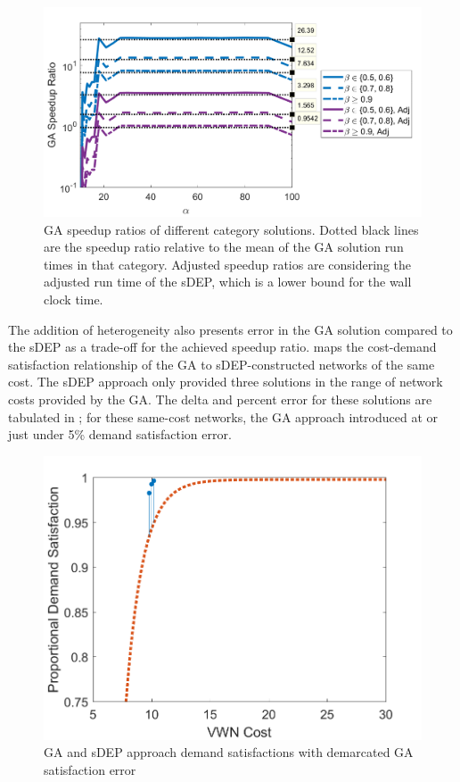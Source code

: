 \documentclass[12pt,dvipsnames]{report}
\begin{document}
\begin{figure}[htp]
	\centering
	\includegraphics[height=0.4\textheight]{Figures/CaseII_GASpeedupRatios2}
	\caption[Case II GA speedup ratios]{GA speedup ratios of different category solutions.  Dotted black lines are the speedup ratio relative to the mean of the GA solution run times in that category.  Adjusted speedup ratios are considering the adjusted run time of the sDEP, which is a lower bound for the wall clock time.}
	\label{fig:CaseII_GASpeedupRatios2}
\end{figure}

The addition of heterogeneity also presents error in the GA solution compared to the sDEP as a trade-off for the achieved speedup ratio.   maps the cost-demand satisfaction relationship of the GA to sDEP-constructed networks of the same cost.  The sDEP approach only provided three solutions in the range of network costs provided by the GA.  The delta and percent error for these solutions are tabulated in ; for these same-cost networks, the GA approach introduced at or just under 5\% demand satisfaction error.

\begin{figure}[htp]
	\centering
	\includegraphics[height=0.4\textheight]{Figures/CaseII_sDEPGASatError}
	\caption[Case II GA and sDEP approach demand satisfactions with GA error]{GA and sDEP approach demand satisfactions with demarcated GA satisfaction error}
	\label{fig:CaseII_sDEPGASatError}
\end{figure}
\end{document}
